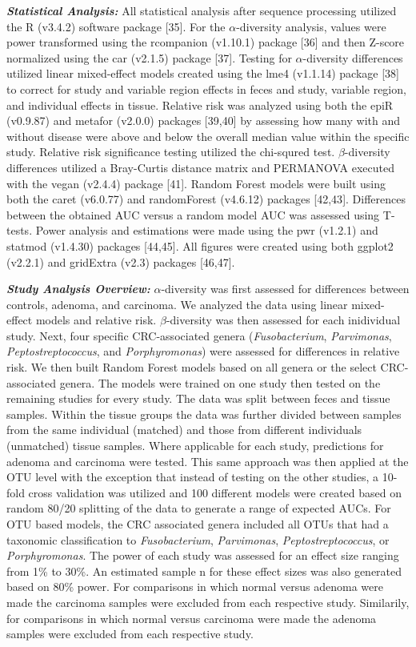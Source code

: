 \documentclass[12pt,]{article}
\begin{document}
\textbf{\emph{Statistical Analysis:}} All statistical analysis after
sequence processing utilized the R (v3.4.2) software package {[}35{]}.
For the \(\alpha\)-diversity analysis, values were power transformed
using the rcompanion (v1.10.1) package {[}36{]} and then Z-score
normalized using the car (v2.1.5) package {[}37{]}. Testing for
\(\alpha\)-diversity differences utilized linear mixed-effect models
created using the lme4 (v1.1.14) package {[}38{]} to correct for study
and variable region effects in feces and study, variable region, and
individual effects in tissue. Relative risk was analyzed using both the
epiR (v0.9.87) and metafor (v2.0.0) packages {[}39,40{]} by assessing
how many with and without disease were above and below the overall
median value within the specific study. Relative risk significance
testing utilized the chi-squred test. \(\beta\)-diversity differences
utilized a Bray-Curtis distance matrix and PERMANOVA executed with the
vegan (v2.4.4) package {[}41{]}. Random Forest models were built using
both the caret (v6.0.77) and randomForest (v4.6.12) packages
{[}42,43{]}. Differences between the obtained AUC versus a random model
AUC was assessed using T-tests. Power analysis and estimations were made
using the pwr (v1.2.1) and statmod (v1.4.30) packages {[}44,45{]}. All
figures were created using both ggplot2 (v2.2.1) and gridExtra (v2.3)
packages {[}46,47{]}.

\textbf{\emph{Study Analysis Overview:}} \(\alpha\)-diversity was first
assessed for differences between controls, adenoma, and carcinoma. We
analyzed the data using linear mixed-effect models and relative risk.
\(\beta\)-diversity was then assessed for each inidividual study. Next,
four specific CRC-associated genera (\emph{Fusobacterium},
\emph{Parvimonas}, \emph{Peptostreptococcus}, and \emph{Porphyromonas})
were assessed for differences in relative risk. We then built Random
Forest models based on all genera or the select CRC-associated genera.
The models were trained on one study then tested on the remaining
studies for every study. The data was split between feces and tissue
samples. Within the tissue groups the data was further divided between
samples from the same individual (matched) and those from different
individuals (unmatched) tissue samples. Where applicable for each study,
predictions for adenoma and carcinoma were tested. This same approach
was then applied at the OTU level with the exception that instead of
testing on the other studies, a 10-fold cross validation was utilized
and 100 different models were created based on random 80/20 splitting of
the data to generate a range of expected AUCs. For OTU based models, the
CRC associated genera included all OTUs that had a taxonomic
classification to \emph{Fusobacterium}, \emph{Parvimonas},
\emph{Peptostreptococcus}, or \emph{Porphyromonas}. The power of each
study was assessed for an effect size ranging from 1\% to 30\%. An
estimated sample n for these effect sizes was also generated based on
80\% power. For comparisons in which normal versus adenoma were made the
carcinoma samples were excluded from each respective study. Similarily,
for comparisons in which normal versus carcinoma were made the adenoma
samples were excluded from each respective study.
\end{document}
